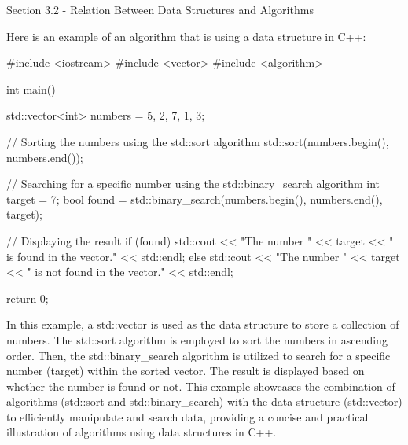 \begin{notes}{Section 3.2 - Relation Between Data Structures and Algorithms}
    \begin{highlight}
        Here is an example of an algorithm that is using a data structure in C++:
    \begin{code}[C++]
    #include <iostream>
    #include <vector>
    #include <algorithm>
    
    int main() {
        std::vector<int> numbers = {5, 2, 7, 1, 3};
        
        // Sorting the numbers using the std::sort algorithm
        std::sort(numbers.begin(), numbers.end());
        
        // Searching for a specific number using the std::binary_search algorithm
        int target = 7;
        bool found = std::binary_search(numbers.begin(), numbers.end(), target);
        
        // Displaying the result
        if (found) {
            std::cout << "The number " << target 
            << " is found in the vector." << std::endl;
        } else {
            std::cout << "The number " << target 
            << " is not found in the vector." << std::endl;
        }
        
        return 0;
    }        
    \end{code}
        In this example, a std::vector is used as the data structure to store a collection of numbers. The std::sort algorithm is employed to sort the numbers in ascending order. Then, the std::binary\_search algorithm is utilized to search for a specific number (target) within the sorted vector. The result is displayed based on whether the number is found or not. This example showcases the combination of algorithms 
        (std::sort and std::binary\_search) with the data structure (std::vector) to efficiently manipulate and search data, providing a concise and practical illustration of algorithms using data structures in C++.
    \end{highlight}
\end{notes}

